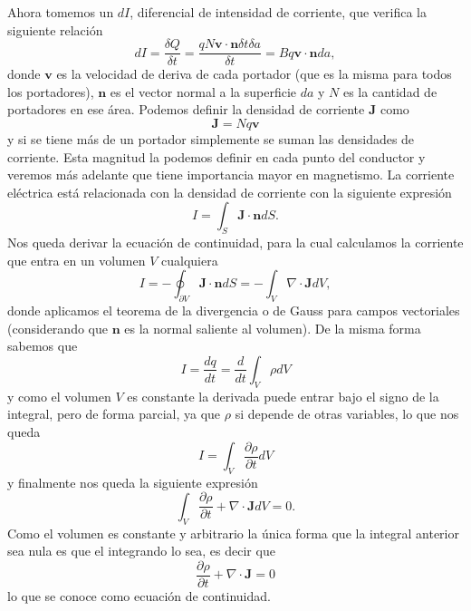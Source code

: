 \documentclass[11pt,a4paper]{article}
\numberwithin{equation}{section}
\begin{document}
Ahora tomemos un $dI$, diferencial de intensidad de corriente, que verifica la siguiente relación \[dI = \frac{\delta Q}{\delta t} = \frac{q N \textbf{v} \cdot \textbf{n} \delta t \delta a}{\delta t} = B q \textbf{v} \cdot \textbf{n} da,\] donde $\textbf{v}$ es la velocidad de deriva de cada portador (que es la misma para todos los portadores), $\textbf{n}$ es el vector normal a la superficie $da$ y $N$ es la cantidad de portadores en ese área. Podemos definir la densidad de corriente $\textbf{J}$ como 
\begin{equation}
    \textbf{J} = N q \textbf{v}
    \label{eq:corriente_densidad}
\end{equation}
y si se tiene más de un portador simplemente se suman las densidades de corriente. Esta magnitud la podemos definir en cada punto del conductor y veremos más adelante que tiene importancia mayor en magnetismo. La corriente eléctrica está relacionada con la densidad de corriente con la siguiente expresión
\begin{equation}
    I = \int_{S} \textbf{J} \cdot \textbf{n} dS.
    \label{eq:corriente_intensidad_densidad}
\end{equation}
Nos queda derivar la ecuación de continuidad, para la cual calculamos la corriente que entra en un volumen $V$ cualquiera \[I = - \oint_{\partial V} \textbf{J} \cdot \textbf{n} dS = -\int_{V} \nabla \cdot \textbf{J} dV,\] donde aplicamos el teorema de la divergencia o de Gauss para campos vectoriales (considerando que $\textbf{n}$ es la normal saliente al volumen). De la misma forma sabemos que \[I = \frac{d q}{d t} = \frac{d}{dt} \int_{V} \rho dV\] y como el volumen $V$ es constante la derivada puede entrar bajo el signo de la integral, pero de forma parcial, ya que $\rho$ si depende de otras variables, lo que nos queda \[I = \int_{V} \frac{\partial \rho}{\partial t} dV\] y finalmente nos queda la siguiente expresión \[\int_{V} \frac{\partial \rho}{\partial t} + \nabla \cdot \textbf{J} dV = 0.\] Como el volumen es constante y arbitrario la única forma que la integral anterior sea nula es que el integrando lo sea, es decir que 
\begin{equation}
    \frac{\partial \rho}{\partial t} + \nabla \cdot \textbf{J} = 0
    \label{eq:corriente_continuidad}
\end{equation}
lo que se conoce como ecuación de continuidad.
\end{document}
